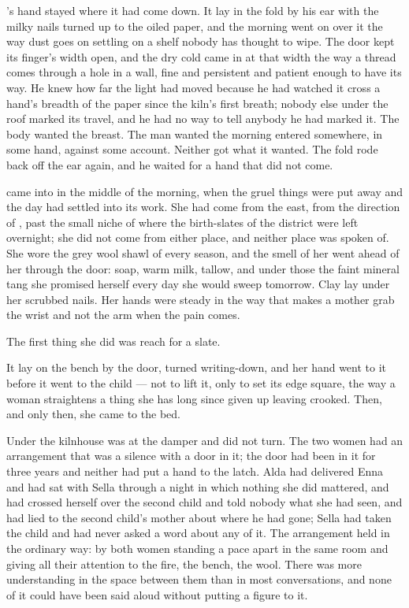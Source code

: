 's hand stayed where it had come down. It lay in the fold by his ear with the milky nails turned up to the oiled paper, and the morning went on over it the way dust goes on settling on a shelf nobody has thought to wipe. The door kept its finger's width open, and the dry cold came in at that width the way a thread comes through a hole in a wall, fine and persistent and patient enough to have its way. He knew how far the light had moved because he had watched it cross a hand's breadth of the paper since the kiln's first breath; nobody else under the roof marked its travel, and he had no way to tell anybody he had marked it. The body wanted the breast. The man wanted the morning entered somewhere, in some hand, against some account. Neither got what it wanted. The fold rode back off the ear again, and he waited for a hand that did not come.

 came into  in the middle of the morning, when the gruel things were put away and the day had settled into its work. She had come from the east, from the direction of , past the small niche of  where the birth-slates of the district were left overnight; she did not come from either place, and neither place was spoken of. She wore the grey wool shawl of every season, and the smell of her went ahead of her through the door: soap, warm milk, tallow, and under those the faint mineral tang she promised herself every day she would sweep tomorrow. Clay lay under her scrubbed nails. Her hands were steady in the way that makes a mother grab the wrist and not the arm when the pain comes.

The first thing she did was reach for a slate.

It lay on the bench by the door, turned writing-down, and her hand went to it before it went to the child --- not to lift it, only to set its edge square, the way a woman straightens a thing she has long since given up leaving crooked. Then, and only then, she came to the bed.

Under the kilnhouse  was at the damper and did not turn. The two women had an arrangement that was a silence with a door in it; the door had been in it for three years and neither had put a hand to the latch. Alda had delivered Enna and had sat with Sella through a night in which nothing she did mattered, and had crossed herself over the second child and told nobody what she had seen, and had lied to the second child's mother about where he had gone; Sella had taken the child and had never asked a word about any of it. The arrangement held in the ordinary way: by both women standing a pace apart in the same room and giving all their attention to the fire, the bench, the wool. There was more understanding in the space between them than in most conversations, and none of it could have been said aloud without putting a figure to it.

